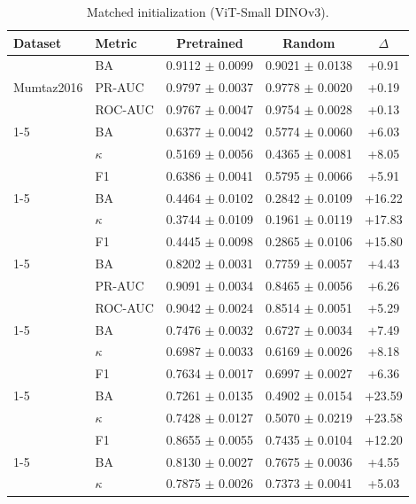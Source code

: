 \begin{table}[tbp]\centering\scriptsize\caption{Matched initialization (ViT-Small DINOv3).}\label{tab:app-init-vit}\begin{tabular}{@{}l l c c c@{}}\toprule Dataset & Metric & Pretrained & Random & $\Delta$ \\ \midrule
\multirow{3}{*}{Mumtaz2016} & BA & 0.9112 $\pm$ 0.0099 & 0.9021 $\pm$ 0.0138 & +0.91 \\
 & PR-AUC & 0.9797 $\pm$ 0.0037 & 0.9778 $\pm$ 0.0020 & +0.19 \\
 & ROC-AUC & 0.9767 $\pm$ 0.0047 & 0.9754 $\pm$ 0.0028 & +0.13 \\
\cmidrule(lr){1-5}
\multirow{3}{*}{PhysioNet-MI} & BA & 0.6377 $\pm$ 0.0042 & 0.5774 $\pm$ 0.0060 & +6.03 \\
 & $\kappa$ & 0.5169 $\pm$ 0.0056 & 0.4365 $\pm$ 0.0081 & +8.05 \\
 & F1 & 0.6386 $\pm$ 0.0041 & 0.5795 $\pm$ 0.0066 & +5.91 \\
\cmidrule(lr){1-5}
\multirow{3}{*}{FACED} & BA & 0.4464 $\pm$ 0.0102 & 0.2842 $\pm$ 0.0109 & +16.22 \\
 & $\kappa$ & 0.3744 $\pm$ 0.0109 & 0.1961 $\pm$ 0.0119 & +17.83 \\
 & F1 & 0.4445 $\pm$ 0.0098 & 0.2865 $\pm$ 0.0106 & +15.80 \\
\cmidrule(lr){1-5}
\multirow{3}{*}{TUAB} & BA & 0.8202 $\pm$ 0.0031 & 0.7759 $\pm$ 0.0057 & +4.43 \\
 & PR-AUC & 0.9091 $\pm$ 0.0034 & 0.8465 $\pm$ 0.0056 & +6.26 \\
 & ROC-AUC & 0.9042 $\pm$ 0.0024 & 0.8514 $\pm$ 0.0051 & +5.29 \\
\cmidrule(lr){1-5}
\multirow{3}{*}{HMC} & BA & 0.7476 $\pm$ 0.0032 & 0.6727 $\pm$ 0.0034 & +7.49 \\
 & $\kappa$ & 0.6987 $\pm$ 0.0033 & 0.6169 $\pm$ 0.0026 & +8.18 \\
 & F1 & 0.7634 $\pm$ 0.0017 & 0.6997 $\pm$ 0.0027 & +6.36 \\
\cmidrule(lr){1-5}
\multirow{3}{*}{TUEV} & BA & 0.7261 $\pm$ 0.0135 & 0.4902 $\pm$ 0.0154 & +23.59 \\
 & $\kappa$ & 0.7428 $\pm$ 0.0127 & 0.5070 $\pm$ 0.0219 & +23.58 \\
 & F1 & 0.8655 $\pm$ 0.0055 & 0.7435 $\pm$ 0.0104 & +12.20 \\
\cmidrule(lr){1-5}
\multirow{3}{*}{ISRUC} & BA & 0.8130 $\pm$ 0.0027 & 0.7675 $\pm$ 0.0036 & +4.55 \\
 & $\kappa$ & 0.7875 $\pm$ 0.0026 & 0.7373 $\pm$ 0.0041 & +5.03 \\

\end{tabular}
\end{table}
